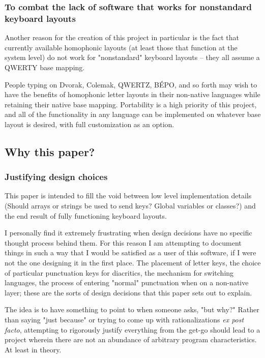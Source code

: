 \documentclass[11pt]{article}
\begin{document}
\subsubsection{To combat the lack of software that works for nonstandard keyboard layouts}
\label{sec:orgc194776}

Another reason for the creation of this project in particular is the fact that currently available homophonic layouts (at least those that function at the system level) do not work for "nonstandard" keyboard layouts -- they all assume a QWERTY base mapping.

People typing on Dvorak, Colemak, QWERTZ, BÉPO, and so forth may wish to have the benefits of homophonic letter layouts in their non-native languages while retaining their native base mapping. Portability is a high priority of this project, and all of the functionality in any language can be implemented on whatever base layout is desired, with full customization as an option.

\subsection{Why this paper?}
\label{sec:orgab234af}

\subsubsection{Justifying design choices}
\label{sec:org67e4eb6}

This paper is intended to fill the void between low level implementation details (Should arrays or strings be used to send keys? Global variables or classes?) and the end result of fully functioning keyboard layouts.

I personally find it extremely frustrating when design decisions have no specific thought process behind them. For this reason I am attempting to document things in such a way that I would be satisfied as a user of this software, if I were not the one designing it in the first place. The placement of letter keys, the choice of particular punctuation keys for diacritics, the mechanism for switching languages, the process of entering "normal" punctuation when on a non-native layer; these are the sorts of design decisions that this paper sets out to explain.

The idea is to have something to point to when someone asks, "but why?" Rather than saying "just because" or trying to come up with rationalizations \emph{ex post facto}, attempting to rigorously justify everything from the get-go should lead to a project wherein there are not an abundance of arbitrary program characteristics. At least in theory.
\end{document}

